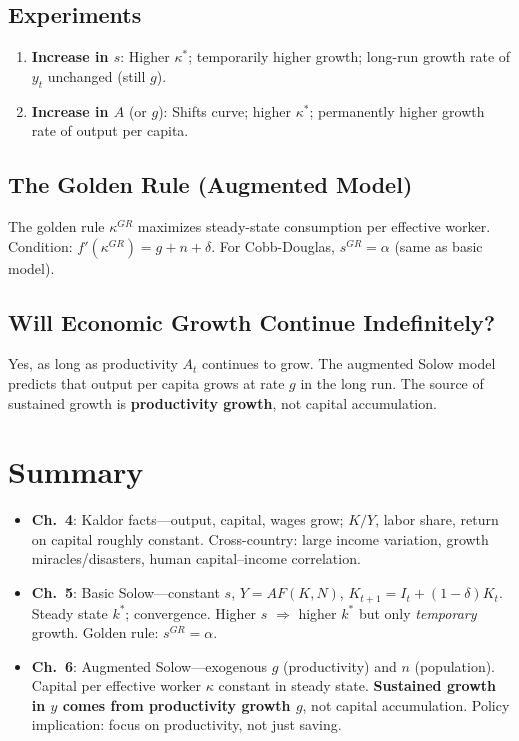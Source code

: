 \documentclass[12pt]{article}
\begin{document}
\subsection{Experiments}
\begin{enumerate}
    \item \textbf{Increase in $s$}: Higher $\kappa^*$; temporarily higher growth; long-run growth rate of $y_t$ unchanged (still $g$).
    \item \textbf{Increase in $A$} (or $g$): Shifts curve; higher $\kappa^*$; permanently higher growth rate of output per capita.
\end{enumerate}

\subsection{The Golden Rule (Augmented Model)}
The golden rule $\kappa^{GR}$ maximizes steady-state consumption per effective worker. Condition: $f'(\kappa^{GR}) = g + n + \delta$. For Cobb-Douglas, $s^{GR} = \alpha$ (same as basic model).

\subsection{Will Economic Growth Continue Indefinitely?}
Yes, as long as productivity $A_t$ continues to grow. The augmented Solow model predicts that output per capita grows at rate $g$ in the long run. The source of sustained growth is \textbf{productivity growth}, not capital accumulation.

\section{Summary}
\begin{itemize}
    \item \textbf{Ch.\ 4}: Kaldor facts---output, capital, wages grow; $K/Y$, labor share, return on capital roughly constant. Cross-country: large income variation, growth miracles/disasters, human capital--income correlation.
    \item \textbf{Ch.\ 5}: Basic Solow---constant $s$, $Y = AF(K,N)$, $K_{t+1} = I_t + (1-\delta)K_t$. Steady state $k^*$; convergence. Higher $s$ $\Rightarrow$ higher $k^*$ but only \emph{temporary} growth. Golden rule: $s^{GR} = \alpha$.
    \item \textbf{Ch.\ 6}: Augmented Solow---exogenous $g$ (productivity) and $n$ (population). Capital per effective worker $\kappa$ constant in steady state. \textbf{Sustained growth in $y$ comes from productivity growth $g$}, not capital accumulation. Policy implication: focus on productivity, not just saving.
\end{itemize}
\end{document}
